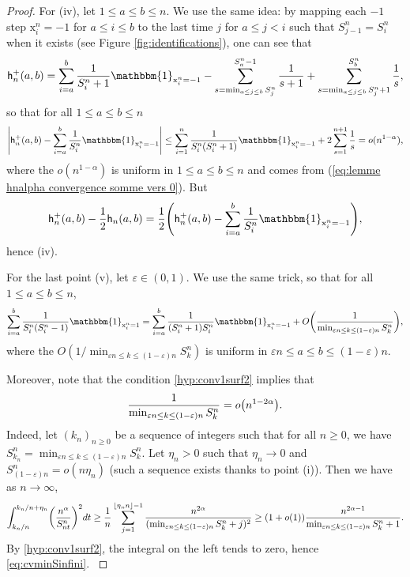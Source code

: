 \documentclass[11pt]{article}
\theoremstyle{plain}
\theoremstyle{definition}
\theoremstyle{remark}
\newcommand{\1}{\mathbbm{1}} %
\newcommand{\e}{\varepsilon} %
\newcommand{\h}{\mathsf{h}} %
\newcommand{\X}{\mathrm x} %
\let\originalleft\left
\let\originalright\right
\renewcommand{\left}{\mathopen{}\mathclose\bgroup\originalleft}
\renewcommand{\right}{\aftergroup\egroup\originalright}
\begin{document}
\begin{proof}
For (iv), let $1\le a \le b \le n$. We use the same idea: by mapping each $-1$ step $\X_i^n=-1$ for $a \le i \le b$ to the last time $j$ for $a \le j<i$ such that $S^n_{j-1}=S^n_i $ when it exists (see Figure \ref{fig:identifications}), one can see that
$$
\h_n^+(a,b) = \sum_{i=a}^b \frac{1}{S^n_i+1} \1_{\X^n_i = -1} - \sum_{s=\min_{a \le j \le b} S^n_j}^{S^n_a-1} \frac{1}{s+1} + \sum_{s=\min_{a \le j \le b} S^n_j+1}^{S^n_b} \frac{1}{s}, 
$$
so that for all $1 \le a \le b \le n$
$$
\left\vert
\h^+_n(a,b)- \sum_{i=a}^b \frac{1}{S^n_i} \1_{\X^n_i=-1}
\right\vert
\le 
\sum_{i=1}^n \frac{1}{S^n_i(S^n_i+1)} \1_{\X^n_i=-1}
+ 2 \sum_{s=1}^{n+1} \frac{1}{s}
= o(n^{1-\alpha}),
$$
where the $o(n^{1-\alpha})$ is uniform in $1\le a \le b \le n$ and comes from (\ref{eq:lemme hnalpha convergence somme vers 0}). But
$$
\h_n^+(a,b)-\frac{1}{2} \h_n(a,b) = \frac{1}{2} \left( 
\h_n^+(a,b) - \sum_{i=a}^b \frac{1}{S^n_i} \1_{\X^n_i=-1}
\right),
$$
hence (iv).

For the last point (v), let $\e \in (0,1)$. We use the same trick, so that for all $1 \le a \le b \le n$,{
\begin{equation}\label{eq:lemme h point cinq1}
\sum_{i=a}^b \frac{1}{S^n_i (S^n_i-1)} \1_{\X^n_i=1}
=
\sum_{i=a}^b \frac{1}{(S^n_i+1)S^n_i} \1_{\X^n_i = -1} +O\left( \frac{1}{\min_{\e n \le k \le (1-\e)n} S^n_k}\right),
\end{equation}
where the $O( 1/{\min_{\e n \le k \le (1-\e)n} S^n_k})$ is uniform in $\e n\le a \le b \le (1-\e)n$.}

{
Moreover, note that the condition \ref{hyp:conv1surf2} implies that
\begin{equation}\label{eq:cvminSinfini}
	\frac{1}{\min_{\e n \le k \le (1-\e)n} S^n_k }= o \left(n^{1-2\alpha}\right).
\end{equation}
Indeed, let $(k_n)_{n\ge 0}$ be a sequence of integers such that for all $n\ge 0$, we have $S^n_{k_n} = \min_{\e n \le k \le (1-\e)n} S^n_k$. Let $\eta_n>0$ such that $\eta_n \to 0$ and $S^n_{(1-\e)n}=o(n\eta_n)$ (such a sequence exists thanks to point (i)). Then we have as $n\to \infty$,
$$
\int_{k_n/n }^{k_n/n+\eta_n} \left(
\frac{n^\alpha}{S^n_{nt}}
\right)^2 dt  \ge \frac{1}{n} \sum_{j=1}^{\lfloor \eta_n n \rfloor -1} \frac{n^{2\alpha}}{(\min_{\e n \le k \le (1-\e)n} S^n_k +j)^2}
\ge (1+o(1)) \frac{n^{2\alpha-1}}{\min_{\e n \le k \le (1-\e)n} S^n_k+1}.
$$
By \ref{hyp:conv1surf2}, the integral on the left tends to zero, hence \eqref{eq:cvminSinfini}.
}


\end{proof}
\end{document}
